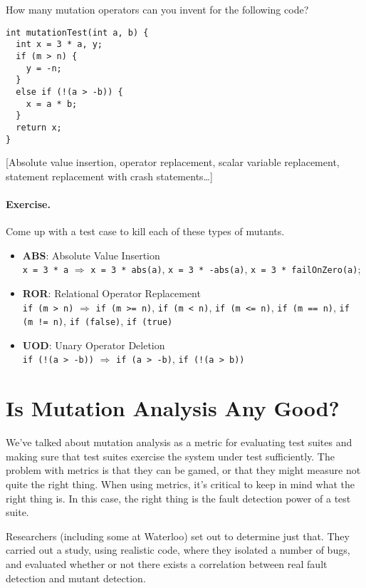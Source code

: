 \documentclass[11pt]{article}
\begin{document}
How
many mutation operators can you invent for the
following code?

{ \Large
\begin{lstlisting}
int mutationTest(int a, b) { 
  int x = 3 * a, y;
  if (m > n) {
    y = -n;
  }
  else if (!(a > -b)) {
    x = a * b;
  }
  return x;
}
\end{lstlisting}
}

[Absolute value insertion, operator replacement, scalar variable replacement,
  statement replacement with crash statements\ldots]

\paragraph{Exercise.} Come up with a test case to kill each of these types of
mutants.

\begin{itemize}
\item {\bf ABS}: Absolute Value Insertion\\
{\tt x = 3 * a}
$\Longrightarrow$ {\tt x = 3 * abs(a)}, {\tt x = 3 * -abs(a)}, {\tt x = 3 * failOnZero(a)};
\item {\bf ROR}: Relational Operator Replacement\\
{\tt if (m > n)} $\Longrightarrow$ {\tt if (m >= n)}, {\tt if (m < n)}, {\tt if (m <= n)}, {\tt if (m == n)}, {\tt if (m != n)}, {\tt if (false)}, {\tt if (true)}
\item {\bf UOD}: Unary Operator Deletion\\
{\tt if (!(a > -b))} $\Longrightarrow$ {\tt if (a > -b)}, {\tt if (!(a > b))}
\end{itemize}


\section*{Is Mutation Analysis Any Good?}
We've talked about mutation analysis as a metric for evaluating test
suites and making sure that test suites exercise the system under test
sufficiently. The problem with metrics is that they can be gamed, or
that they might measure not quite the right thing. When using metrics,
it's critical to keep in mind what the right thing is. In this case,
the right thing is the fault detection power of a test suite.

Researchers (including some at Waterloo) set out to determine just that. They carried out a
study, using realistic code, where they isolated a number of bugs, and
evaluated whether or not there exists a correlation between real fault
detection and mutant detection.
\end{document}
